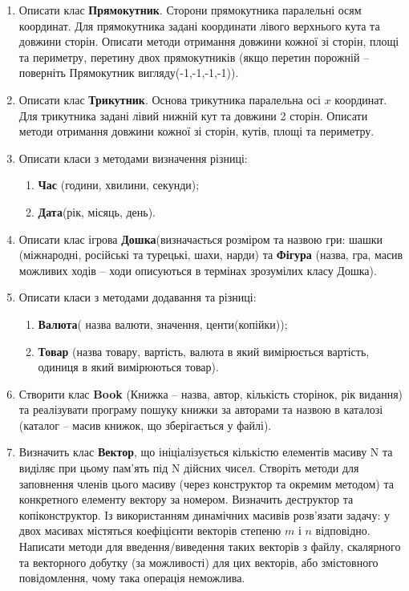 \documentclass[]{article}
\makeatletter
\newcommand{\xslalph}[1]{\expandafter\@xslalph\csname c@#1\endcsname}
\newcommand{\@xslalph}[1]{%
    \ifcase#1\or а\or б\or в\or г\or д\or e\or є\or ж\or з\or i%
    \or й\or к\or л\or м\or н\or о\or п\or р\or с\or т%
    \or у\or ф\or х\or ц\or ч\or ш\or ю\or я\or аа\or бб\or вв%
    \else\@ctrerr\fi%
}
\makeatother
\begin{document}
\begin{enumerate}
\begin{enumerate}[label=\xslalph*)]
\begin{enumerate}
\begin{enumerate}[label=\xslalph*)]
\begin{enumerate}
\item
  Описати клас \textbf{Прямокутник}. Сторони прямокутника паралельні
  осям координат. Для прямокутника задані координати лівого верхнього
  кута та довжини сторін. Описати методи отримання довжини кожної зі
  сторін, площі та периметру, перетину двох прямокутників (якщо перетин
  порожній -- поверніть Прямокутник вигляду(-1,-1,-1,-1)).
\item
  Описати клас \textbf{Трикутник}. Основа трикутника паралельна осі
  $x$ координат. Для трикутника задані лівий нижній кут та довжини
  2 сторін. Описати методи отримання довжини кожної зі сторін, кутів,
  площі та периметру.

\item
  Описати класи з методами визначення різниці:
\begin{enumerate}[label=\xslalph*)]
\item \textbf{Час} (години, хвилини, секунди);
\item \textbf{Дата}(рік, місяць, день).
\end{enumerate}

\item
  Описати клас ігрова \textbf{Дошка}(визначається розміром та назвою
  гри: шашки (міжнародні, російські та турецькі, шахи, нарди) та
  \textbf{Фігура} (назва, гра, масив можливих ходів -- ходи описуються в
  термінах зрозумілих класу Дошка).

\item
  Описати класи з методами додавання та різниці:
\begin{enumerate}[label=\xslalph*)]
\item \textbf{Валюта}( назва валюти, значення, центи(копійки));
\item \textbf{Товар} (назва товару, вартість, валюта в який вимірюється
вартість, одиниця в який вимірюються товар).
\end{enumerate}

\item
  Створити клас \textbf{Book} (Книжка -- назва, автор, кількість сторінок, рік
  видання) та реалізувати програму пошуку книжки за авторами та назвою в
  каталозі (каталог -- масив книжок, що зберігається у файлі).
  
\item
  Визначить клас \textbf{Вектор}, що ініціалізується кількістю елементів масиву N
  та виділяє при цьому пам'ять під N дійсних чисел. Створіть методи для
  заповнення членів цього масиву (через конструктор та окремим методом)
  та конкретного елементу вектору за номером. Визначить деструктор та
  копіконструктор. Із використанням динамічних масивів розв'язати
  задачу: у двох масивах містяться коефіцієнти векторів степеню $m$ і $n$
  відповідно. Написати методи для введення/виведення таких векторів з файлу,
  скалярного та векторного добутку (за можливості) для цих векторів, або
 змістовного повідомлення, чому така операція неможлива.
 

\end{enumerate}
\end{enumerate}
\end{enumerate}
\end{enumerate}
\end{enumerate}
\end{document}
